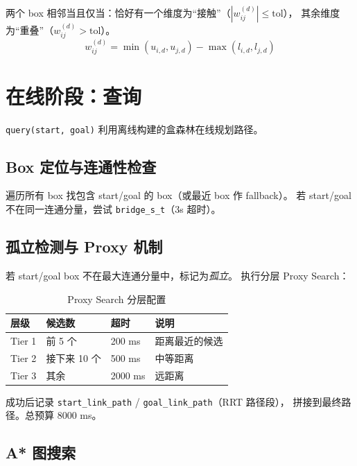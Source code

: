 \documentclass[11pt,a4paper]{article}
\begin{document}
两个 box 相邻当且仅当：恰好有一个维度为``接触''（$|w_{ij}^{(d)}| \le \mathrm{tol}$），
其余维度为``重叠''（$w_{ij}^{(d)} > \mathrm{tol}$）。
\begin{equation}
w_{ij}^{(d)} = \min(u_{i,d}, u_{j,d}) - \max(l_{i,d}, l_{j,d})
\end{equation}


\section{在线阶段：查询}
\label{sec:query}

\texttt{query(start, goal)} 利用离线构建的盒森林在线规划路径。

\subsection{Box 定位与连通性检查}

遍历所有 box 找包含 start/goal 的 box（或最近 box 作 fallback）。
若 start/goal 不在同一连通分量，尝试 \texttt{bridge\_s\_t}（3s 超时）。

\subsection{孤立检测与 Proxy 机制}

若 start/goal box 不在最大连通分量中，标记为\emph{孤立}。
执行分层 Proxy Search：

\begin{table}[ht]
\centering
\caption{Proxy Search 分层配置}
\label{tab:proxy}
\begin{tabular}{@{}llll@{}}
\toprule
\textbf{层级} & \textbf{候选数} & \textbf{超时} & \textbf{说明} \\
\midrule
Tier 1 & 前 5 个 & 200 ms & 距离最近的候选 \\
Tier 2 & 接下来 10 个 & 500 ms & 中等距离 \\
Tier 3 & 其余 & 2000 ms & 远距离 \\
\bottomrule
\end{tabular}
\end{table}

成功后记录 \texttt{start\_link\_path} / \texttt{goal\_link\_path}（RRT 路径段），
拼接到最终路径。总预算 8000 ms。

\subsection{A* 图搜索}
\end{document}

